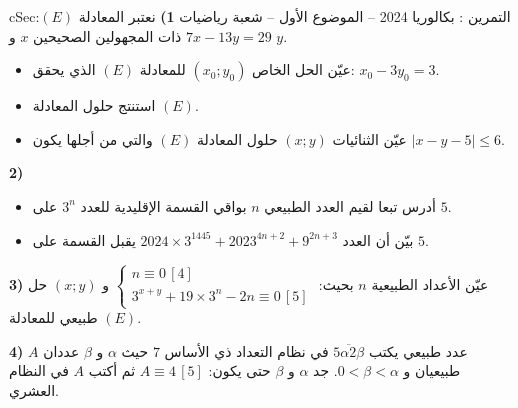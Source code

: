 \documentclass[12pt,a4paper]{article}
\newenvironment{BOX}[2]{\begin{otherlanguage}{english}\begin{arbox}{#1}{#2}}{\end{arbox}\end{otherlanguage}}
\newcounter{exo}
\newenvironment{tamrin}[1]{\stepcounter{exo}\begin{BOX}{cSec}{التمرين \theexo: #1}}{\end{BOX}}
\newenvironment{sq}{\begin{itemize}[leftmargin=2.4em,itemsep=3pt]}{\end{itemize}}
\newcommand{\qa}{\item[(أ)]}\newcommand{\qb}{\item[(ب)]}\newcommand{\qc}{\item[(جـ)]}\newcommand{\qd}{\item[(د)]}\newcommand{\qe}{\item[(هـ)]}
\begin{document}
\begin{tamrin}{بكالوريا 2024 -- الموضوع الأول -- شعبة رياضيات}
\textbf{1)} نعتبر المعادلة $(E)$:\quad $7x-13y=29$ ذات المجهولين الصحيحين $x$ و $y$.
\begin{sq}
\qa عيّن الحل الخاص $(x_0;y_0)$ للمعادلة $(E)$ الذي يحقق: $x_0-3y_0=3$.
\qb استنتج حلول المعادلة $(E)$.
\qc عيّن الثنائيات $(x;y)$ حلول المعادلة $(E)$ والتي من أجلها يكون $|x-y-5|\le6$.
\end{sq}
\textbf{2)}
\begin{sq}
\qa أدرس تبعا لقيم العدد الطبيعي $n$ بواقي القسمة الإقليدية للعدد $3^n$ على $5$.
\qb بيّن أن العدد $2024\times3^{1445}+2023^{4n+2}+9^{2n+3}$ يقبل القسمة على $5$.
\end{sq}
\textbf{3)} عيّن الأعداد الطبيعية $n$ بحيث:
$\begin{cases} n\equiv0\,[4]\\ 3^{x+y}+19\times3^n-2n\equiv0\,[5]\end{cases}$
و $(x;y)$ حل طبيعي للمعادلة $(E)$.

\textbf{4)} $A$ عدد طبيعي يكتب $\overline{5\alpha2\beta}$ في نظام التعداد ذي الأساس $7$ حيث $\alpha$ و $\beta$ عددان طبيعيان و $0<\beta<\alpha$.
جد $\alpha$ و $\beta$ حتى يكون: $A\equiv4\,[5]$ ثم أكتب $A$ في النظام العشري.
\end{tamrin}
\end{document}
